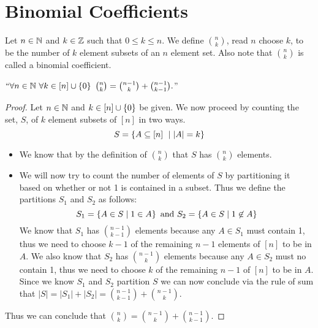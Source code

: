     \section{Binomial Coefficients}
        \begin{definition}
            Let $n \in \mathbb{N}$ and $k \in \mathbb{Z}$ such that $0 \le k \le n$.
            We define $\binom{n}{k}$, read $n$ choose $k$, to be the number of
            $k$ element subsets of an $n$ element set. Also note that $\binom{n}{k}$
            is called a binomial coefficient.
        \end{definition}
        \begin{lemma}
            $``\forall n \in \set{N} \ \forall k \in \union{[n]}{\Set{0}} \ 
            \binom{n}{k} = \binom{n - 1}{k} + \binom{n - 1}{k - 1}.$''
            \label{rec binom lemma}
        \end{lemma}
        \begin{proof}
            Let $n \in \mathbb{N}$ and $k \in [n] \cup \left\{0\right\}$ be given. We now proceed
            by counting the set, $S$, of $k$ element subsets of $[n]$ in two ways.
            \[
                S = \left\{A \subseteq [n] \  \mid |A| = k\right\}
            \]
            \begin{itemize}
                \item
                    We know that by the definition of $\binom{n}{k}$ that $S$ has $\binom{n}{k}$
                    elements.
                \item
                    We will now try to count the number of elements of $S$ by partitioning it
                    based on whether or not 1 is contained in a subset. Thus we define the
                    partitions $S_1$ and $S_2$ as follows:
                    \[
                        S_1 = \left\{A \in S \mid 1 \in A\right\} \mbox{ and } S_2 = \left\{A \in S \mid 1 \not\in A\right\}
                    \]
                    We know that $S_1$ has $\binom{n - 1}{k - 1}$ elements because
                    any $A \in S_1$ must contain 1, thus we need to choose
                    $k - 1$ of the remaining $n - 1$ elements of $[n]$ to be in $A$. We also
                    know that $S_2$ has $\binom{n - 1}{k}$ elements because any $A \in S_2$ must
                    no contain 1, thus we need to choose $k$ of the remaining $n - 1$ of $[n]$ to
                    be in $A$. Since we know $S_1$ and $S_2$ partition $S$ we can now conclude
                    via the rule of sum that $|S| = |S_1| + |S_2| = \binom{n - 1}{k - 1} + \binom{n - 1}{k}.$
            \end{itemize}
            Thus we can conclude that $\binom{n}{k} = \binom{n - 1}{k} + \binom{n - 1}{k - 1}$. \QED
        \end{proof}
